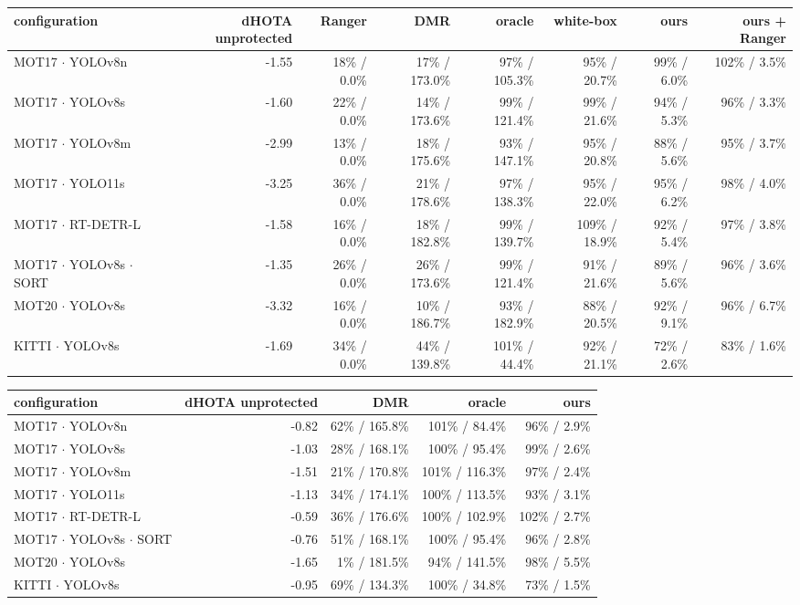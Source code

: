 \begin{tabular}{lrrrrrrr}
\toprule
configuration & dHOTA unprotected & Ranger & DMR & oracle & white-box & ours & ours + Ranger \\
\midrule
MOT17 $\cdot$ YOLOv8n & -1.55 & 18\% / 0.0\% & 17\% / 173.0\% & 97\% / 105.3\% & 95\% / 20.7\% & 99\% / 6.0\% & 102\% / 3.5\% \\
MOT17 $\cdot$ YOLOv8s & -1.60 & 22\% / 0.0\% & 14\% / 173.6\% & 99\% / 121.4\% & 99\% / 21.6\% & 94\% / 5.3\% & 96\% / 3.3\% \\
MOT17 $\cdot$ YOLOv8m & -2.99 & 13\% / 0.0\% & 18\% / 175.6\% & 93\% / 147.1\% & 95\% / 20.8\% & 88\% / 5.6\% & 95\% / 3.7\% \\
MOT17 $\cdot$ YOLO11s & -3.25 & 36\% / 0.0\% & 21\% / 178.6\% & 97\% / 138.3\% & 95\% / 22.0\% & 95\% / 6.2\% & 98\% / 4.0\% \\
MOT17 $\cdot$ RT-DETR-L & -1.58 & 16\% / 0.0\% & 18\% / 182.8\% & 99\% / 139.7\% & 109\% / 18.9\% & 92\% / 5.4\% & 97\% / 3.8\% \\
MOT17 $\cdot$ YOLOv8s $\cdot$ SORT & -1.35 & 26\% / 0.0\% & 26\% / 173.6\% & 99\% / 121.4\% & 91\% / 21.6\% & 89\% / 5.6\% & 96\% / 3.6\% \\
MOT20 $\cdot$ YOLOv8s & -3.32 & 16\% / 0.0\% & 10\% / 186.7\% & 93\% / 182.9\% & 88\% / 20.5\% & 92\% / 9.1\% & 96\% / 6.7\% \\
KITTI $\cdot$ YOLOv8s & -1.69 & 34\% / 0.0\% & 44\% / 139.8\% & 101\% / 44.4\% & 92\% / 21.1\% & 72\% / 2.6\% & 83\% / 1.6\% \\
\bottomrule
\end{tabular}

\begin{tabular}{lrrrr}
\toprule
configuration & dHOTA unprotected & DMR & oracle & ours \\
\midrule
MOT17 $\cdot$ YOLOv8n & -0.82 & 62\% / 165.8\% & 101\% / 84.4\% & 96\% / 2.9\% \\
MOT17 $\cdot$ YOLOv8s & -1.03 & 28\% / 168.1\% & 100\% / 95.4\% & 99\% / 2.6\% \\
MOT17 $\cdot$ YOLOv8m & -1.51 & 21\% / 170.8\% & 101\% / 116.3\% & 97\% / 2.4\% \\
MOT17 $\cdot$ YOLO11s & -1.13 & 34\% / 174.1\% & 100\% / 113.5\% & 93\% / 3.1\% \\
MOT17 $\cdot$ RT-DETR-L & -0.59 & 36\% / 176.6\% & 100\% / 102.9\% & 102\% / 2.7\% \\
MOT17 $\cdot$ YOLOv8s $\cdot$ SORT & -0.76 & 51\% / 168.1\% & 100\% / 95.4\% & 96\% / 2.8\% \\
MOT20 $\cdot$ YOLOv8s & -1.65 & 1\% / 181.5\% & 94\% / 141.5\% & 98\% / 5.5\% \\
KITTI $\cdot$ YOLOv8s & -0.95 & 69\% / 134.3\% & 100\% / 34.8\% & 73\% / 1.5\% \\
\bottomrule
\end{tabular}

